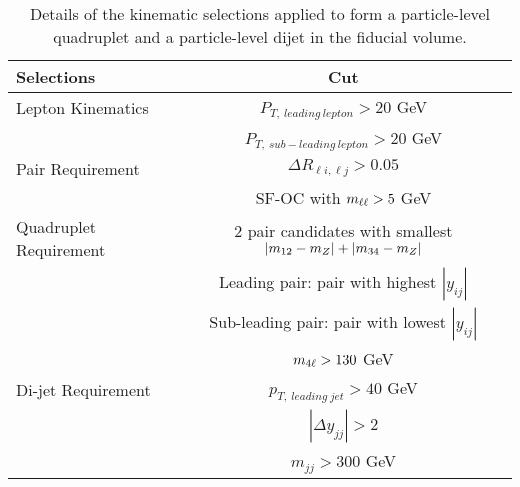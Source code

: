 \begin{table}[!htbp]
    \caption{Details of the kinematic selections applied to form a particle-level quadruplet and a particle-level dijet in the fiducial volume. 
    \label{tab:QuadDijetFidCut}}
    \begin{tabular}{|| l || c ||}
        \hline
        Selections              &           Cut \\
        \hline\hline
        Lepton Kinematics       & $P_{T,~leading~lepton} > 20 $ GeV\\
                                & $P_{T,~sub-leading~lepton} > 20 $ GeV\\
        \hline 
        Pair Requirement        & $\Delta R_{\ell i,\ell     j} > 0.05 $\\
                                & SF-OC with $m_{\ell\ell} > 5$ GeV\\
        \hline
        Quadruplet Requirement  & $2$ pair candidates with smallest $|m_{12}  - m_{Z} | + |m_{34}    - m_{Z} |$  \\
                                & Leading pair: pair with highest $|y_{ij}|$\\
                                & Sub-leading pair: pair with lowest $|y_{ij}|$\\
                                & $m_{4\ell} > 130 $ GeV\\
        \hline
        Di-jet Requirement      & $p_{T,~leading~jet} > 40$ GeV \\
                                & $|\Delta y_{jj}| > 2 $ \\ 
                                & $m_{jj} > 300$ GeV    \\
        \hline
    \end{tabular}
\end{table}
